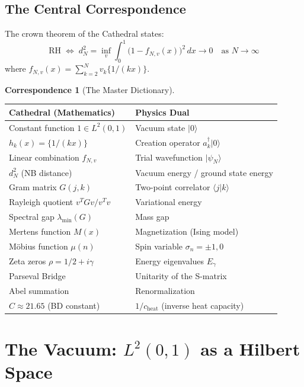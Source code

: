 \documentclass[11pt,a4paper]{article}
\theoremstyle{definition}
\newtheorem{correspondence}[definition]{Correspondence}
\newcommand{\RH}{\mathrm{RH}}
\newcommand{\fract}[1]{\{#1\}}
\newcommand{\ket}[1]{| #1 \rangle}
\newcommand{\braket}[2]{\langle #1 | #2 \rangle}
\begin{document}
\subsection{The Central Correspondence}

The crown theorem of the Cathedral states:
\[
  \RH \;\iff\;
  d_N^2 = \inf_v \int_0^1 \bigl(1 - f_{N,v}(x)\bigr)^2\,dx \to 0
  \quad\text{as } N \to \infty
\]
where $f_{N,v}(x) = \sum_{k=2}^N v_k \fract{1/(kx)}$.

\begin{correspondence}[The Master Dictionary]
\label{corr:master}
\begin{center}
\begin{tabular}{@{}ll@{}}
\toprule
\textbf{Cathedral (Mathematics)} & \textbf{Physics Dual} \\
\midrule
Constant function $1 \in L^2(0,1)$ & Vacuum state $\ket{0}$ \\
$h_k(x) = \fract{1/(kx)}$ & Creation operator $a_k^\dagger \ket{0}$ \\
Linear combination $f_{N,v}$ & Trial wavefunction $\ket{\psi_N}$ \\
$d_N^2$ (NB distance) & Vacuum energy / ground state energy \\
Gram matrix $G(j,k)$ & Two-point correlator $\braket{j}{k}$ \\
Rayleigh quotient $v^T G v / v^T v$ & Variational energy \\
Spectral gap $\lambda_{\min}(G)$ & Mass gap \\
Mertens function $M(x)$ & Magnetization (Ising model) \\
M\"obius function $\mu(n)$ & Spin variable $\sigma_n = \pm 1, 0$ \\
Zeta zeros $\rho = 1/2 + i\gamma$ & Energy eigenvalues $E_\gamma$ \\
Parseval Bridge & Unitarity of the S-matrix \\
Abel summation & Renormalization \\
$C \approx 21.65$ (BD constant) & $1/c_{\text{heat}}$ (inverse heat capacity) \\
\bottomrule
\end{tabular}
\end{center}
\end{correspondence}

\section{The Vacuum: $L^2(0,1)$ as a Hilbert Space}
\end{document}
